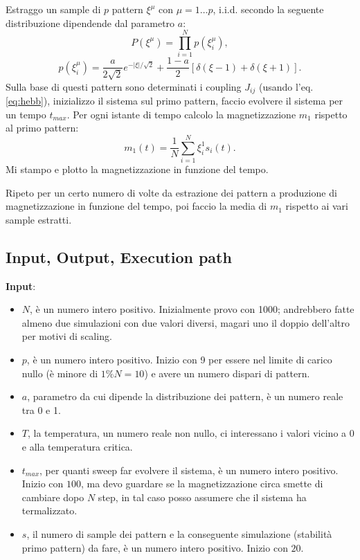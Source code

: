 \documentclass[a4paper,10pt]{article}
\begin{document}
Estraggo un sample di $p$ pattern $\xi^\mu$ con $\mu=1\ldots p$, i.i.d. secondo la seguente distribuzione dipendende dal parametro $a$:
\[
 P(\xi^\mu)=\prod_{i=1}^N p(\xi_i^\mu),
\]
\[
 p(\xi_i^\mu) = \frac{a}{2\sqrt{2}} e^{-|\xi|/\sqrt{2}} + \frac{1-a}{2} \left[ \delta(\xi-1) + \delta(\xi+1) \right].
\]
Sulla base di questi pattern sono determinati i coupling $J_{ij}$ (usando l'eq. \ref{eq:hebb}), inizializzo il sistema sul primo pattern, faccio evolvere il sistema per un tempo $t_{max}$. Per ogni istante di tempo calcolo la magnetizzazione $m_1$ rispetto al primo pattern:
\[
 m_1(t)=\frac{1}{N}\sum_{i=1}^N \xi_i^1 s_i(t) .
\]
Mi stampo e plotto la magnetizzazione in funzione del tempo.

Ripeto per un certo numero di volte da estrazione dei pattern a produzione di magnetizzazione in funzione del tempo, poi faccio la media di $m_1$ rispetto ai vari sample estratti.

\subsection{Input, Output, Execution path}

\textbf{Input}: \begin{itemize}
\item $N$, è un numero intero positivo. Inizialmente provo con 1000; andrebbero fatte almeno due simulazioni con due valori diversi, magari uno il doppio dell'altro per motivi di scaling.
\item $p$, è un numero intero positivo. Inizio con 9 per essere nel limite di carico nullo (è minore di $1\%N=10$) e avere un numero dispari di pattern.
\item $a$, parametro da cui dipende la distribuzione dei pattern, è un numero reale tra 0 e 1.
\item $T$, la temperatura, un numero reale non nullo, ci interessano i valori vicino a 0 e alla temperatura critica.
\item $t_{max}$, per quanti sweep far evolvere il sistema, è un numero intero positivo. Inizio con $100$, ma devo guardare se la magnetizzazione circa smette di cambiare dopo $N$ step, in tal caso posso assumere che il sistema ha termalizzato.
\item $s$, il numero di sample dei pattern e la conseguente simulazione (stabilità primo pattern) da fare, è un numero intero positivo. Inizio con $20$.                                                                                                                                                                                                                                             \end{itemize}
\end{document}
